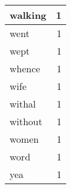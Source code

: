 \begin{center}
\begin{longtable}{l|r}
walking & 1 \\ \hline
went & 1 \\ \hline
wept & 1 \\ \hline
whence & 1 \\ \hline
wife & 1 \\ \hline
withal & 1 \\ \hline
without & 1 \\ \hline
women & 1 \\ \hline
word & 1 \\ \hline
yea & 1 \\ \hline
\end{longtable}
\end{center}



\normalsize



 
